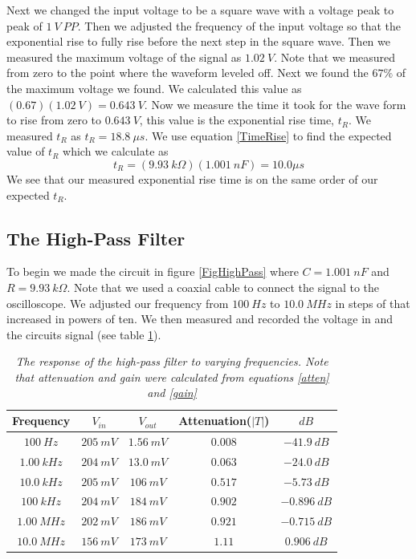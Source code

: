 \documentclass[11pt]{article}
\numberwithin{equation}{section}
\numberwithin{figure}{section}
\numberwithin{table}{section}
\begin{document}
Next we changed the input voltage to be a square wave with a voltage peak to peak of $1\ V\ PP$. Then we adjusted the frequency of the input voltage so that the exponential rise to fully rise before the next step in the square wave. Then we measured the maximum voltage of the signal as $1.02\ V$. Note that we measured from zero to the point where the waveform leveled off. Next we found the $67\%$ of the maximum voltage we found. We calculated this value as $(0.67)(1.02\ V) = 0.643\ V$. Now we measure the time it took for the wave form to rise from zero to $0.643\ V$, this value is the exponential rise time, $t_R$. We measured $t_R$ as $t_R =18.8\ \mu s$. We use equation \ref{TimeRise} to find the expected value of $t_R$ which we calculate as
$$t_R = (9.93\ k\Omega)(1.001\ nF) = 10.0 \mu s$$
We see that our measured exponential rise time is on the same order of our expected $t_R$.

\subsection{The High-Pass Filter}
To begin we made the circuit in figure \ref{FigHighPass} where $C=1.001\ nF$ and $R=9.93\ k\Omega$. Note that we used a coaxial cable to connect the signal to the oscilloscope. We adjusted our frequency from $100\ Hz$ to $10.0\ MHz$ in steps of that increased in powers of ten. We then measured and recorded the voltage in and the circuits signal (see table \ref{HighPass}).
\begin{table}[h]
\centering
\begin{tabular}{ccccc}
Frequency	&$V_{in}$	&$V_{out}$	&Attenuation($|T|$)	&$dB$\\
\hline
$100\ Hz$	&$205\ mV$	&$1.56\ mV$	&$0.008$	&$-41.9\ dB$\\
$1.00\ kHz$	&$204\ mV$	&$13.0\ mV$	&$0.063$	&$-24.0\ dB$\\
$10.0\ kHz$	&$205\ mV$	&$106\ mV$	&$0.517$	&$-5.73\ dB$\\
$100\ kHz$	&$204\ mV$	&$184\ mV$	&$0.902$	&$-0.896\ dB$\\
$1.00\ MHz$	&$202\ mV$	&$186\ mV$	&$0.921$	&$-0.715\ dB$\\
$10.0\ MHz$	&$156\ mV$	&$173\ mV$	&$1.11$		&$0.906\ dB$\\
\end{tabular}
\caption{\textit{The response of the high-pass filter to varying frequencies. Note that attenuation and gain were calculated from equations \ref{atten} and \ref{gain}}}
\label{HighPass}
\end{table}
\end{document}
